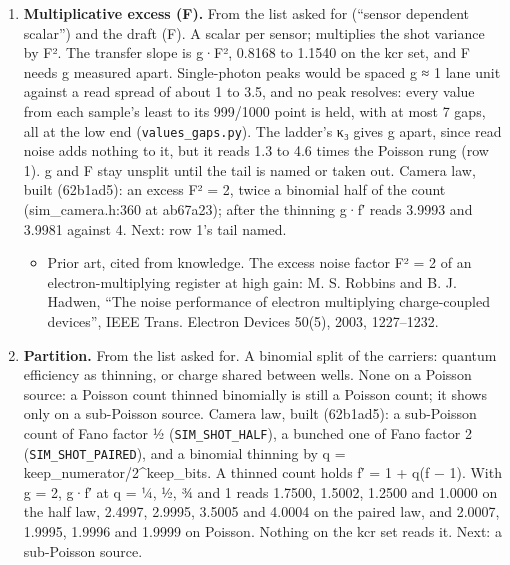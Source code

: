 \begin{enumerate}
\item \textbf{Multiplicative excess (F).} From the list asked for (“sensor dependent scalar”) and the draft (F). A scalar per sensor; multiplies the shot variance by F². The transfer slope is g·F², 0.8168 to 1.1540 on the kcr set, and F needs g measured apart. Single-photon peaks would be spaced g ≈ 1 lane unit against a read spread of about 1 to 3.5, and no peak resolves: every value from each sample's least to its 999/1000 point is held, with at most 7 gaps, all at the low end (\texttt{values\_\allowbreak{}gaps.\allowbreak{}py}). The ladder's κ₃ gives g apart, since read noise adds nothing to it, but it reads 1.3 to 4.6 times the Poisson rung (row 1). g and F stay unsplit until the tail is named or taken out. Camera law, built (62b1ad5): an excess F² = 2, twice a binomial half of the count (sim\_\allowbreak{}camera.h:360 at ab67a23); after the thinning g·f′ reads 3.9993 and 3.9981 against 4. Next: row 1's tail named.

\begin{itemize}
\item Prior art, cited from knowledge. The excess noise factor F² = 2 of an electron-multiplying register at high gain: M. S. Robbins and B. J. Hadwen, “The noise performance of electron multiplying charge-coupled devices”, IEEE Trans. Electron Devices 50(5), 2003, 1227–1232.
\end{itemize}
\item \textbf{Partition.} From the list asked for. A binomial split of the carriers: quantum efficiency as thinning, or charge shared between wells. None on a Poisson source: a Poisson count thinned binomially is still a Poisson count; it shows only on a sub-Poisson source. Camera law, built (62b1ad5): a sub-Poisson count of Fano factor ½ (\texttt{SIM\_\allowbreak{}SHOT\_\allowbreak{}HALF}), a bunched one of Fano factor 2 (\texttt{SIM\_\allowbreak{}SHOT\_\allowbreak{}PAIRED}), and a binomial thinning by q = keep\_\allowbreak{}numerator/2\textasciicircum{}keep\_\allowbreak{}bits. A thinned count holds f′ = 1 + q(f − 1). With g = 2, g·f′ at q = ¼, ½, ¾ and 1 reads 1.7500, 1.5002, 1.2500 and 1.0000 on the half law, 2.4997, 2.9995, 3.5005 and 4.0004 on the paired law, and 2.0007, 1.9995, 1.9996 and 1.9999 on Poisson. Nothing on the kcr set reads it. Next: a sub-Poisson source.


\end{enumerate}
